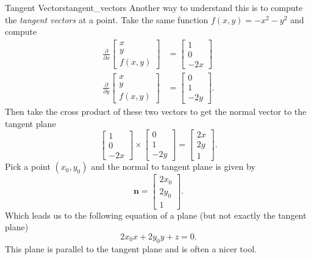         \begin{ex}{Tangent Vectors}{tangent_vectors}
        Another way to understand this is to compute the \emph{tangent vectors} at a point. Take the same function $f(x,y)=-x^2-y^2$ and compute
        \begin{align*}
            \frac{\partial}{\partial x}\begin{bmatrix} x \\ y \\ f(x,y)\end{bmatrix} &= \begin{bmatrix} 1\\ 0 \\ -2x\end{bmatrix}\\
            \frac{\partial}{\partial y}\begin{bmatrix} x \\ y \\ f(x,y)\end{bmatrix} &= \begin{bmatrix} 0\\ 1 \\ -2y\end{bmatrix}.
        \end{align*}
        Then take the cross product of these two vectors to get the normal vector to the tangent plane
        \[
        \begin{bmatrix} 1 \\ 0 \\-2x\end{bmatrix} \times \begin{bmatrix} 0 \\ 1 \\ -2y\end{bmatrix} = \begin{bmatrix} 2x \\ 2y \\ 1\end{bmatrix}.
        \]
        Pick a point $(x_0,y_0)$ and the normal to tangent plane is given by
        \[
        \mathbf{n}=\begin{bmatrix} 2x_0 \\ 2y_0 \\ 1 \end{bmatrix}.
        \]
        Which leads us to the following equation of a plane (but not exactly the tangent plane)
        \[
        2x_0 x + 2y_0y+z=0.
        \]
        This plane is parallel to the tangent plane and is often a nicer tool.
        \end{ex}
        
